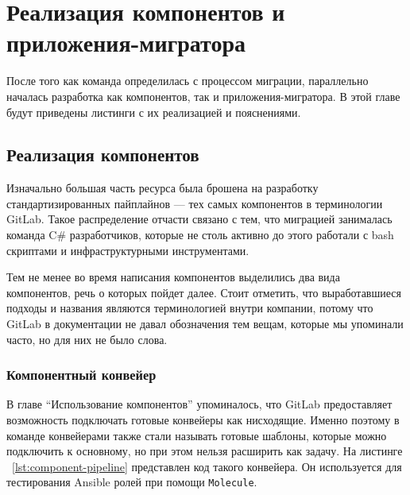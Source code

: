 \chapter{Реализация компонентов и приложения-мигратора} \label{ch:ch3}
После того как команда определилась с процессом миграции, параллельно началась разработка как компонентов, так и приложения-мигратора.
В этой главе будут приведены листинги с их реализацией и пояснениями.

\section{Реализация компонентов} \label{sec:components-impl}
Изначально большая часть ресурса была брошена на разработку стандартизированных пайплайнов — тех самых компонентов в терминологии GitLab.
Такое распределение отчасти связано с тем, что миграцией занималась команда C\# разработчиков, которые не столь активно до этого работали
с bash скриптами\cite{bash} и инфраструктурными инструментами.

Тем не менее во время написания компонентов выделились два вида компонентов, речь о которых пойдет далее.
Стоит отметить, что выработавшиеся подходы и названия являются терминологией внутри компании,
потому что GitLab в документации не давал обозначения тем вещам, которые мы упоминали часто, но для них не было слова.

\subsection{Компонентный конвейер} \label{subsec:component-template}
В главе \enquote{Использование компонентов} упоминалось,
что GitLab предоставляет возможность подключать готовые конвейеры как нисходящие.
Именно поэтому в команде конвейерами также стали называть готовые шаблоны, которые можно подключить
к основному, но при этом нельзя расширить как задачу.
На листинге ~\ref{lst:component-pipeline} представлен код такого конвейера.
Он используется для тестирования Ansible ролей при помощи \texttt{Molecule}\cite{molecule}.

